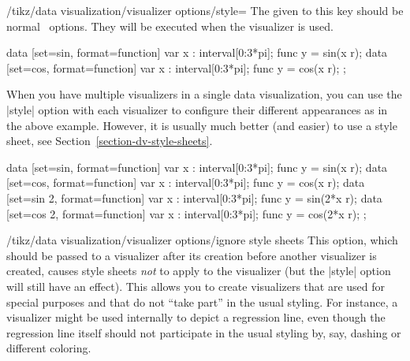 \begin{key}{/tikz/data visualization/visualizer options/style=}
    The  given to this key should be normal \tikzname\ options.
    They will be executed when the visualizer is used.
\begin{codeexample}[
    width=7cm,
    preamble={\usetikzlibrary{datavisualization.formats.functions}},
]
\tikz \datavisualization
 [scientific axes=clean,
  visualize as smooth line=sin,
  sin={style={red, densely dotted}},
  visualize as smooth line=cos,
  cos={style={mark=x}},
]
data [set=sin, format=function] {
  var x : interval[0:3*pi];
  func y = sin(\value x r);
}
data [set=cos, format=function] {
  var x : interval[0:3*pi];
  func y = cos(\value x r);
};
\end{codeexample}

    When you have multiple visualizers in a single data visualization, you can
    use the |style| option with each visualizer to configure their different
    appearances as in the above example. However, it is usually much better
    (and easier) to use a style sheet, see
    Section~\ref{section-dv-style-sheets}.
\begin{codeexample}[
    width=7cm,
    preamble={\usetikzlibrary{datavisualization.formats.functions}},
]
\tikz \datavisualization
 [scientific axes={clean, end labels},
  x axis={label=$x$}, y axis={grid={major also at=0}},
  visualize as smooth line/.list={sin,cos,sin 2,cos 2},
  legend={below, rows=2},
  sin={label in legend={text=$\sin x$}},
  cos={label in legend={text=$\cos x$}},
  sin 2={label in legend={text=$\sin 2x$}},
  cos 2={label in legend={text=$\cos 2x$}},
  style sheet=strong colors]
data [set=sin, format=function] {
  var x : interval[0:3*pi];
  func y = sin(\value x r);
}
data [set=cos, format=function] {
  var x : interval[0:3*pi];
  func y = cos(\value x r);
}
data [set=sin 2, format=function] {
  var x : interval[0:3*pi];
  func y = sin(2*\value x r);
}
data [set=cos 2, format=function] {
  var x : interval[0:3*pi];
  func y = cos(2*\value x r);
};
\end{codeexample}
\end{key}

\begin{key}{/tikz/data visualization/visualizer options/ignore style sheets}
    This option, which should be passed to a visualizer after its creation
    before another visualizer is created, causes style sheets \emph{not} to
    apply to the visualizer (but the |style| option will still have an effect).
    This allows you to create visualizers that are used for special purposes
    and that do not ``take part'' in the usual styling. For instance, a
    visualizer might be used internally to depict a regression line, even
    though the regression line itself should not participate in the usual
    styling by, say, dashing or different coloring.
\end{key}

